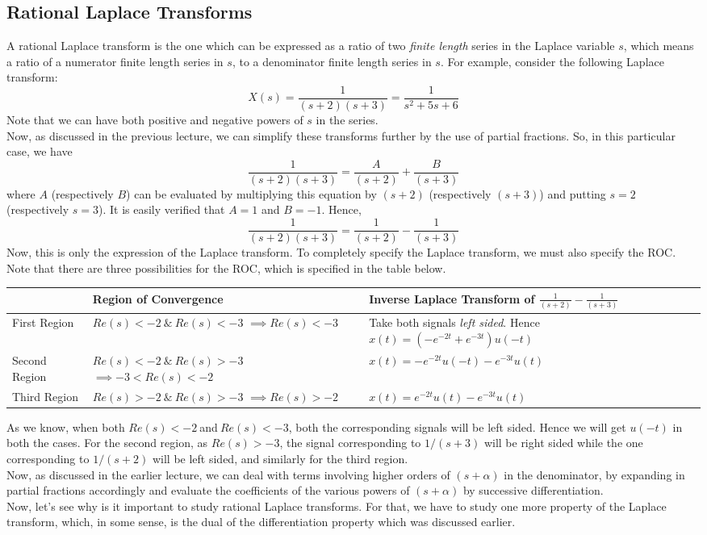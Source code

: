 \subsection{Rational Laplace Transforms}
A rational Laplace transform is the one which can be expressed as a ratio of two \emph{finite length} series in the Laplace variable $s$, which means a ratio of a numerator finite length series in $s$, to a denominator finite length series in $s$. For example, consider the following Laplace transform:\\
\[
X(s) = \frac{1}{(s+2)(s+3)} = \frac{1}{s^2+5s+6}
\]
Note that we can have both positive and negative powers of $s$ in the series.\\
Now, as discussed in the previous lecture, we can simplify these transforms further by the use of partial fractions. So, in this particular case, we have
\[
\frac{1}{(s+2)(s+3)} = \frac{A}{(s+2)} + \frac{B}{(s+3)}
\]
where $A$ (respectively $B$) can be evaluated by multiplying this equation by $(s+2)$ (respectively $(s+3)$) and putting $s=2$ (respectively $s=3$). It is easily verified that $A=1$ and $B=-1$. Hence,
\[
\frac{1}{(s+2)(s+3)} = \frac{1}{(s+2)} - \frac{1}{(s+3)}
\]
Now, this is only the expression of the Laplace transform. To completely specify the Laplace transform, we must also specify the ROC. Note that there are three possibilities for the ROC, which is specified in the table below.
\begin{center}
  \begin{tabular}{| l | p{5cm} | p{6cm} | }
    \hline
     & Region of Convergence & Inverse Laplace Transform of $\frac{1}{(s+2)} - \frac{1}{(s+3)}$ \\ \hline \hline
    First Region & $Re(s)<-2 \ \& \ Re(s)<-3$ $\implies Re(s)<-3$ &  Take both signals \emph{left sided}. Hence $ x(t)=(-e^{-2t} +e^{-3t})u(-t)$ \\ \hline \hline
        Second Region & $Re(s)<-2 \ \& \ Re(s)>-3$ $\implies -3<Re(s)<-2$ &  $x(t) = -e^{-2t}u(-t) - e^{-3t}u(t)$ \\ \hline \hline
                Third Region & $Re(s)>-2 \ \& \ Re(s)>-3$ $\implies Re(s)>-2$&  $x(t) = e^{-2t}u(t) - e^{-3t}u(t)$ \\ 
    \hline
  \end{tabular}
\end{center}
As we know, when both $Re(s)<-2 \ $and$ \ Re(s)<-3$, both the corresponding signals will be left sided. Hence
we will get $u(-t)$ in both the cases. For the second region, as $Re(s)>-3$, the signal corresponding to $1/(s+3)$ will be right sided while the one corresponding to $1/(s+2)$ will be left sided, and similarly for the third region.\\
Now, as discussed in the earlier lecture, we can deal with terms involving higher orders of $(s+\alpha)$ in the denominator, by expanding in partial fractions accordingly and evaluate the coefficients of the various powers of $(s+\alpha)$ by successive differentiation.\\
Now, let's see why is it important to study rational Laplace transforms. For that, we have to study one more property of the Laplace transform, which, in some sense, is the dual of the differentiation property which was discussed earlier. 

